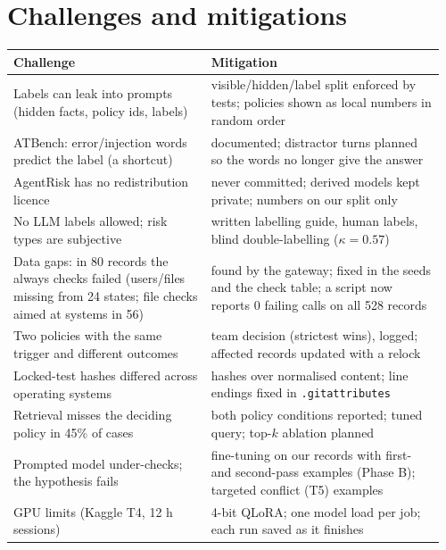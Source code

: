 \documentclass[10pt]{article}
\begin{document}
\section{Challenges and mitigations}
\begin{center}\small
\begin{tabular}{@{}L{0.44\linewidth}L{0.52\linewidth}@{}}
\toprule
\textbf{Challenge} & \textbf{Mitigation}\\
\midrule
Labels can leak into prompts (hidden facts, policy ids, labels) & visible/hidden/label split enforced by tests; policies shown as local numbers in random order\\
ATBench: error/injection words predict the label (a shortcut) & documented; distractor turns planned so the words no longer give the answer\\
AgentRisk has no redistribution licence & never committed; derived models kept private; numbers on our split only\\
No LLM labels allowed; risk types are subjective & written labelling guide, human labels, blind double-labelling ($\kappa=0.57$)\\
Data gaps: in 80 records the always checks failed (users/files missing from 24 states; file checks aimed at systems in 56) & found by the gateway; fixed in the seeds and the check table; a script now reports 0 failing calls on all 528 records\\
Two policies with the same trigger and different outcomes & team decision (strictest wins), logged; affected records updated with a relock\\
Locked-test hashes differed across operating systems & hashes over normalised content; line endings fixed in \texttt{.gitattributes}\\
Retrieval misses the deciding policy in 45\% of cases & both policy conditions reported; tuned query; top-$k$ ablation planned\\
Prompted model under-checks; the hypothesis fails & fine-tuning on our records with first- and second-pass examples (Phase B); targeted conflict (T5) examples\\
GPU limits (Kaggle T4, 12 h sessions) & 4-bit QLoRA; one model load per job; each run saved as it finishes\\
\bottomrule
\end{tabular}
\end{center}
\end{document}
